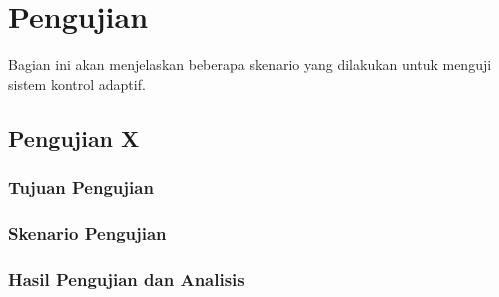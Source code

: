 \section{Pengujian}

Bagian ini akan menjelaskan beberapa skenario yang dilakukan untuk menguji sistem kontrol adaptif.

\subsection{Pengujian X}

\subsubsection{Tujuan Pengujian}

\subsubsection{Skenario Pengujian}

\subsubsection{Hasil Pengujian dan Analisis}